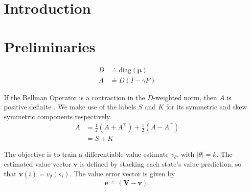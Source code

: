 \documentclass{article}
\theoremstyle{plain}
\theoremstyle{definition}
\theoremstyle{remark}
\begin{document}
\begin{abstract}
  Value function estimation is a core problem in Reinforcement Learning.
  Monte-Carlo methods compute an unbiased estimate of the value function, but can suffer variance 
  related to the length and noisiness of the task.
  Temporal differences methods (TD Learning) are popular in part because they reduce variance, and in part because they induce local Bellman-consistency of the learned value function. 
  However, TD learning can fail to converge when using non-linear function approximation.
  We study a new learning rule based on the minimization of a convex Bellman-smoothed value loss.
  We extend previous results that show when TD learning succeeds at lowering the Bellman-smoothed value loss. 
  Our main contribution is using this loss for value function learning in deep RL. 
  We first show how to estimate the new objective in an unbiased fashion from trajectory data -- with strictly lower variance than Monte Carlo.
  We show that in expectation, the learned value function leads to stronger policy improvement than classical TD learning.
  We experiment on RL tasks, including continuous control, showing that our value function loss improves the performance of PPO.
\end{abstract}

\section{Introduction}
\section{Preliminaries}
\begin{align}
  D &\doteq \text{diag}(\bm{\mu}) \label{def:D} \\
  A &\doteq D(I-\gamma P) \label{def:A}
\end{align}

If the Bellman Operator is a contraction in the $D$-weighted norm, then $A$ is positive definite \cite{Tsitsiklis1997Analysis}. We make use of the labels $S$ and $K$ for its symmetric and skew symmetric components respectively.
\begin{align}
  A &= \frac{1}{2} (A + A^\intercal) + \frac{1}{2}(A - A^\intercal) \\
    &= S + K \label{def:SK}
\end{align}

The objective is to train a differentiable value estimate $v_\theta$, with $|\theta|=k$.  
The estimated value vector $\bm{v}$ is defined by stacking each state's value prediction, so that $\bm{v}(i) = v_\theta(s_i)$. The value error vector is given by
\begin{align}
  \bm{e} \doteq (\bm{V}-\bm{v}).
\end{align}
\end{document}
